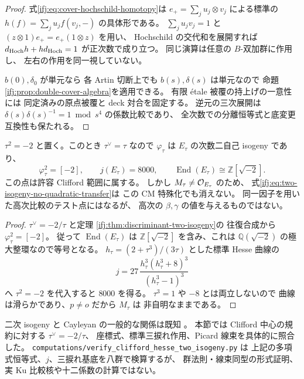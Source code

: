 \begin{proof}
式\eqref{ifj:eq:cover-hochschild-homotopy}は
$e_+=\sum_j u_j\otimes v_j$ による標準の
$h(f)=\sum_j u_jf(v_j,-)$ の具体形である。
$\sum_j u_jv_j=1$ と
$(z\otimes1)e_+=e_+(1\otimes z)$ を用い、
Hochschild の交代和を展開すれば
$d_{\rm Hoch}h+hd_{\rm Hoch}=1$ が正次数で成り立つ。
同じ演算は任意の $B$-双加群に作用し、
左右の作用を同一視していない。

$b(0),\delta_0$ が単元なら
各 Artin 切断上でも $b(s),\delta(s)$ は単元なので
命題\ref{ifj:prop:double-cover-algebra}を適用できる。
有限 \'{e}tale 被覆の持上げの一意性には
同定済みの原点被覆と deck 対合を固定する。
逆元の三次展開は
$\delta(s)\delta(s)^{-1}=1\bmod s^4$ の係数比較であり、
全次数での分離恒等式と底変更互換性も保たれる。
\end{proof}

\begin{corollary}
\label{ifj:cor:two-isogeny-cm-specialization}
$\tau^2=-2$ と置く。このとき
$\tau^\vee=\tau$ なので $\varphi_\tau$ は
$E_\tau$ の次数二自己 isogeny であり、
\[
 \varphi_\tau^2=[-2],\qquad j(E_\tau)=8000,\qquad
             \operatorname{End}(E_\tau)\cong\mathbb Z[\sqrt{-2}].
\]
この点は許容 Clifford 範囲に属する。
しかし $M_\tau\ne\mathcal O_{E_\tau}$ のため、
式\eqref{ifj:eq:two-isogeny-no-quadratic-transfer}は
この CM 特殊化でも消えない。
同一因子を用いた高次比較のテスト点にはなるが、
高次の $\beta,\gamma$ の値を与えるものではない。
\end{corollary}

\begin{proof}
$\tau^\vee=-2/\tau$ と定理
\ref{ifj:thm:discriminant-two-isogeny}の
往復合成から $\varphi_\tau^2=[-2]$。
従って $\operatorname{End}(E_\tau)$ は
$\mathbb Z[\sqrt{-2}]$ を含み、これは
$\mathbb Q(\sqrt{-2})$ の極大整環なので等号となる。
$h_\tau=(2+\tau^3)/(3\tau)$ とした標準 Hesse 曲線の
\[
 j=27\,\frac{h_\tau^3(h_\tau^3+8)^3}{(h_\tau^3-1)^3}
\]
へ $\tau^2=-2$ を代入すると $8000$ を得る。
$\tau^3=1$ や $-8$ とは両立しないので
曲線は滑らかであり、$p\ne o$ だから $M_\tau$ は
非自明なままである。
\end{proof}

\begin{remark}[文献と検算の限界]
\label{ifj:rem:two-isogeny-scope}
二次 isogeny と Cayleyan の一般的な関係は既知
\cite[Proposition~2.5]{IFJOudomphengCayleyan}。
本節では Clifford 中心の規約に対する $\tau^\vee=-2/\tau$、
座標式、標準三捩れ作用、Picard 線束を具体的に照合した。
\texttt{computations/verify\_clifford\_hesse\_two\_isogeny.py} は
上記の多項式恒等式、$j$、三捩れ基底を八群で検算するが、
群法則・線束同型の形式証明、実 Ku 比較核や十二係数の計算ではない。
\end{remark}

